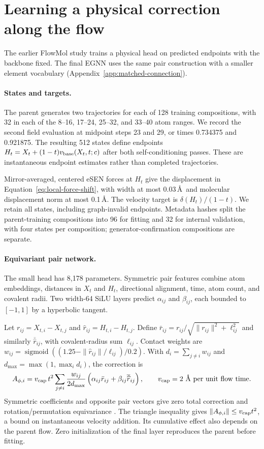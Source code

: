 \section{Learning a physical correction along the flow}\label{app:force-correction}
The earlier FlowMol study trains a physical head on predicted endpoints with the backbone fixed. The final EGNN uses the same pair construction with a smaller element vocabulary (Appendix~\ref{app:matched-connection}).

\paragraph{States and targets.}
The parent generates two trajectories for each of 128 training compositions, with 32 in each of the 8--16, 17--24, 25--32, and 33--40 atom ranges. We record the second field evaluation at midpoint steps 23 and 29, or times 0.734375 and 0.921875. The resulting 512 states define endpoints $H_t=X_t+(1-t)v_{\rm base}(X_t,t;c)$ after both self-conditioning passes. These are instantaneous endpoint estimates rather than completed trajectories.

Mirror-averaged, centered eSEN forces at $H_t$ give the displacement in Equation~\ref{eq:local-force-shift}, with width at most 0.03\,\AA\ and molecular displacement norm at most 0.1\,\AA. The velocity target is $\delta(H_t)/(1-t)$. We retain all states, including graph-invalid endpoints. Metadata hashes split the parent-training compositions into 96 for fitting and 32 for internal validation, with four states per composition; generator-confirmation compositions are separate.

\paragraph{Equivariant pair network.}
The small head has 8,178 parameters. Symmetric pair features combine atom embeddings, distances in $X_t$ and $H_t$, directional alignment, time, atom count, and covalent radii. Two width-64 SiLU layers predict $\alpha_{ij}$ and $\beta_{ij}$, each bounded to $[-1,1]$ by a hyperbolic tangent.

Let $r_{ij}=X_{t,i}-X_{t,j}$ and $\widehat r_{ij}=H_{t,i}-H_{t,j}$. Define $\bar r_{ij}=r_{ij}/\sqrt{\|r_{ij}\|^2+\ell_{ij}^2}$ and similarly $\overline{\widehat r}_{ij}$, with covalent-radius sum $\ell_{ij}$. Contact weights are $w_{ij}=\operatorname{sigmoid}((1.25-\|\widehat r_{ij}\|/\ell_{ij})/0.2)$. With $d_i=\sum_{j\ne i}w_{ij}$ and $d_{\max}=\max(1,\max_i d_i)$, the correction is
\begin{equation}
 A_{\phi,i}=v_{\rm cap}\,t^2\sum_{j\ne i}
 \frac{w_{ij}}{2d_{\max}}
 \left(\alpha_{ij}\bar r_{ij}+\beta_{ij}\overline{\widehat r}_{ij}\right),
 \qquad v_{\rm cap}=2\text{ \AA\ per unit flow time}.
\end{equation}
Symmetric coefficients and opposite pair vectors give zero total correction and rotation/permutation equivariance \citep{satorras2021egnn}. The triangle inequality gives $\|A_{\phi,i}\|\leq v_{\rm cap}t^2$, a bound on instantaneous velocity addition. Its cumulative effect also depends on the parent flow. Zero initialization of the final layer reproduces the parent before fitting.

